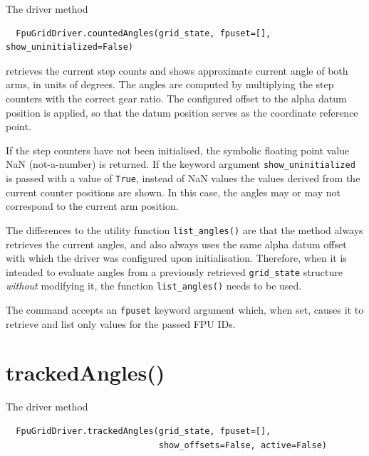 \documentclass[fontsize=12,a4paper]{scrreprt}
\begin{document}
The driver method

\begin{verbatim}
  FpuGridDriver.countedAngles(grid_state, fpuset=[], show_uninitialized=False)
\end{verbatim}
retrieves the current step counts and shows approximate current angle
of both arms, in units of degrees. The angles are computed by
multiplying the step counters with the correct gear ratio. The
configured offset to the alpha datum position is applied, so that the
datum position serves as the coordinate reference point.

If the step counters have not been initialised, the symbolic floating
point value NaN (not-a-number) is returned.  If the keyword argument
\texttt{show\_uninitialized} is passed with a value of \texttt{True},
instead of NaN values the values derived from the current counter
positions are shown. In this case, the angles may or may not
correspond to the current arm position.

The differences to the utility function \texttt{list\_angles()} are
that the method always retrieves the current angles, and also always
uses the same alpha datum offset with which the driver was configured
upon initialisation. Therefore, when it is intended to evaluate angles
from a previously retrieved \texttt{grid\_state} structure
\emph{without} modifying it, the function \texttt{list\_angles()}
needs to be used.

The command accepts an \texttt{fpuset} keyword argument which, when
set, causes it to retrieve and list only values for the passed FPU
IDs.


\section{trackedAngles()}
\label{sec:trackedangles}

The driver method

\begin{verbatim}
  FpuGridDriver.trackedAngles(grid_state, fpuset=[],
                              show_offsets=False, active=False)
\end{verbatim}
\end{document}

